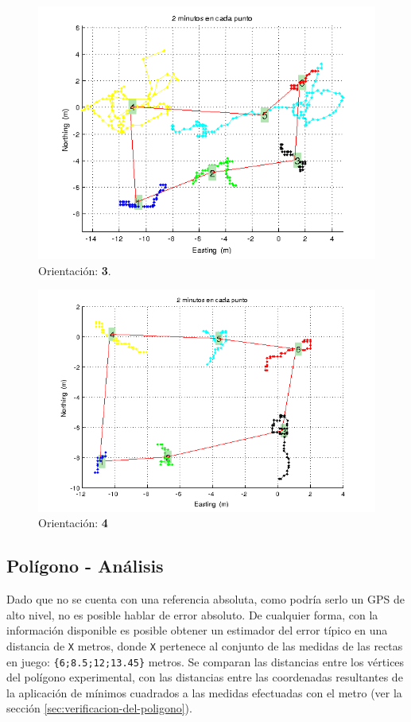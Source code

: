 \documentclass[spanish,12pt,a4paper,titlepage]{report}
\begin{document}
\newpage
\begin{figure}[h!]
  \centering
  \includegraphics[width=.8\textwidth]{./img/or2_poly_cut.png}
  \caption{Orientación: \textbf{3}.}
\vspace{-30pt}
  \label{fig:or2_poly_cut.png}
\end{figure}

\begin{figure}[h!]
  \centering
  \includegraphics[width=.8\textwidth]{./img/or3_pol.png}
  \caption{Orientación: \textbf{4}}
  \label{fig:or3_pol.png}
\end{figure}

\subsection{Polígono - Análisis}
\label{sec:poligono-analisis}

Dado que no se cuenta con una referencia absoluta, como podría serlo un GPS de alto nivel, no es posible hablar de error absoluto. De cualquier forma, con la información disponible es posible obtener un estimador del error típico en una distancia de \verb+X+ metros, donde \verb+X+ pertenece al conjunto de las medidas de las rectas en juego: \verb+{6;8.5;12;13.45}+ metros. Se comparan las distancias entre los vértices del polígono experimental, con las distancias entre las coordenadas resultantes de la aplicación de mínimos cuadrados a las medidas efectuadas con el metro (ver la sección \ref{sec:verificacion-del-poligono}).
\end{document}
